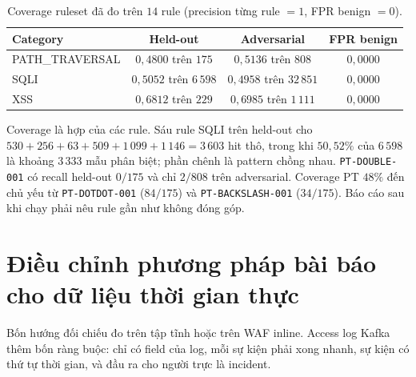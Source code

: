 \documentclass[a4paper,11pt]{article}
\begin{document}
\begin{table}[ht]
\centering
\caption{Coverage ruleset đã đo trên $14$ rule (precision từng rule $= 1$, FPR benign $= 0$).}
\label{tab:cov}
\small
\begin{tabular}{@{}lccc@{}}
\toprule
Category & Held-out & Adversarial & FPR benign \\
\midrule
PATH\_TRAVERSAL & $0{,}4800$ trên $175$ & $0{,}5136$ trên $808$ & $0{,}0000$ \\
SQLI & $0{,}5052$ trên $6\,598$ & $0{,}4958$ trên $32\,851$ & $0{,}0000$ \\
XSS & $0{,}6812$ trên $229$ & $0{,}6985$ trên $1\,111$ & $0{,}0000$ \\
\bottomrule
\end{tabular}
\end{table}

Coverage là hợp của các rule. Sáu rule SQLI trên held-out cho $530+256+63+509+1\,099+1\,146 = 3\,603$ hit thô, trong khi $50{,}52\%$ của $6\,598$ là khoảng $3\,333$ mẫu phân biệt; phần chênh là pattern chồng nhau. \texttt{PT-DOUBLE-001} có recall held-out $0/175$ và chỉ $2/808$ trên adversarial. Coverage PT $48\%$ đến chủ yếu từ \texttt{PT-DOTDOT-001} ($84/175$) và \texttt{PT-BACKSLASH-001} ($34/175$). Báo cáo sau khi chạy phải nêu rule gần như không đóng góp.

\section{Điều chỉnh phương pháp bài báo cho dữ liệu thời gian thực}

Bốn hướng đối chiếu đo trên tập tĩnh hoặc trên WAF inline. Access log Kafka thêm bốn ràng buộc: chỉ có field của log, mỗi sự kiện phải xong nhanh, sự kiện có thứ tự thời gian, và đầu ra cho người trực là incident.
\end{document}
